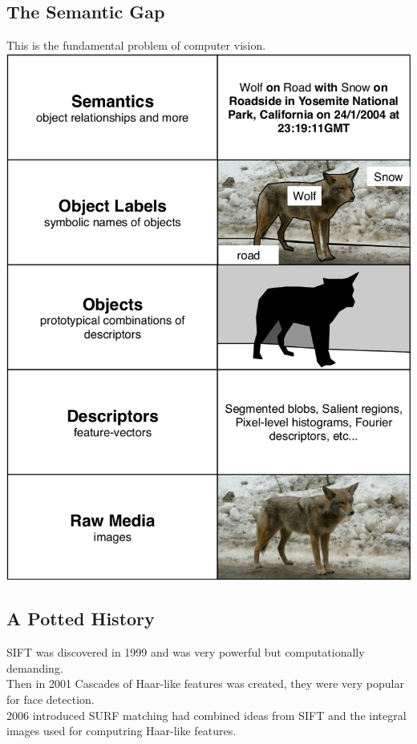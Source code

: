\documentclass{article}
\begin{document}
	\subsection*{The Semantic Gap}
	This is the fundamental problem of computer vision.\\
	\includegraphics[scale=0.38]{semantic_gap}
	\subsection*{A Potted History}
	SIFT was discovered in 1999 and was very powerful but computationally demanding.\\
	Then in 2001 Cascades of Haar-like features was created, they were very popular for face detection.\\
	2006 introduced SURF matching had combined ideas from SIFT and the integral images used for computring Haar-like features.
	
\end{document}
